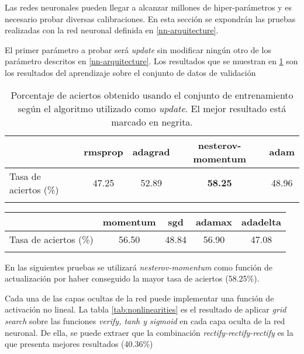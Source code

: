 Las redes neuronales pueden llegar a alcanzar millones de hiper-parámetros \cite{NovikovPOV15} y es necesario
probar diversas calibraciones. En esta sección se expondrán las pruebas realizadas con la red neuronal definida
en \ref{nn-arquitecture}.

El primer parámetro a probar será \textit{update} sin modificar ningún otro de los parámetro descritos en \ref{nn-arquitecture}. Los resultados que se muestran en \ref{tab:update} son los resultados del aprendizaje sobre el
conjunto de datos de validación


\begin{table}[htp]
\caption{Porcentaje de aciertos obtenido usando el conjunto de entrenamiento según el algoritmo utilizado como
\textit{update}. El mejor resultado está marcado en negrita.}
\label{tab:update}
\centering
\begin{tabular}{l c c c c}
\toprule
& \textbf{rmsprop} & \textbf{adagrad} & \textbf{nesterov-momentum}  &   \textbf{adam}  \\
\midrule
Tasa de aciertos (\%) & 47.25 & 52.89 & \textbf{58.25} & 48.96   \\
\bottomrule\\

\end{tabular}
\end{table}


\begin{table}[htp]
\label{tab:aciertos}
\centering
\begin{tabular}{l c c c c }
\toprule
 & \textbf{momentum} &  \textbf{sgd}  &  \textbf{adamax}  & \textbf{adadelta}\\
\midrule
Tasa de aciertos (\%) & 56.50 & 48.84 & 56.90 & 47.08 \\
\bottomrule\\

\end{tabular}
\end{table}



En las siguientes pruebas se utilizará \textit{nesterov-momentum} como función de actualización por haber conseguido la mayor tasa de aciertos (58.25\%). 

Cada una de las capas ocultas de la red puede implementar una función de activación no lineal\cite{nonlinearities}. La tabla \ref{tab:nonlinearities} es el resultado de aplicar \textit{grid search} sobre las funciones \textit{verify, tanh y sigmoid} en cada capa oculta de la red neuronal. De ella, se puede extraer que la combinación \textit{rectify-rectify-rectify} es la que presenta mejores resultados (40.36\%)

